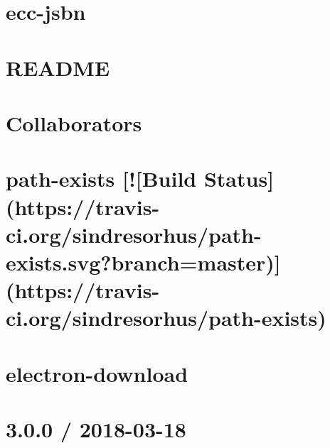 \documentclass[twoside]{book}
\newcommand{\+}{\discretionary{\mbox{\scriptsize$\hookleftarrow$}}{}{}}
\begin{document}
\chapter{ecc-\/jsbn}
\label{md_dsmacc_examples_DRmerge_node_modules_ecc-jsbn_README}

\chapter{R\+E\+A\+D\+ME}
\label{md_dsmacc_examples_DRmerge_node_modules_electron_README}

\chapter{Collaborators}
\label{md_dsmacc_examples_DRmerge_node_modules_electron-download_collaborators}

\chapter{path-\/exists \mbox{[}!\mbox{[}Build Status\mbox{]}(https\+://travis-\/ci.org/sindresorhus/path-\/exists.svg?branch=master)\mbox{]}(https\+://travis-\/ci.org/sindresorhus/path-\/exists)}
\label{md_dsmacc_examples_DRmerge_node_modules_electron-download_node_modules_path-exists_readme}

\chapter{electron-\/download}
\label{md_dsmacc_examples_DRmerge_node_modules_electron-download_readme}

\chapter{3.0.0 / 2018-\/03-\/18}
\label{md_dsmacc_examples_DRmerge_node_modules_electron-osx-sign_node_modules_plist_History}

\end{document}
